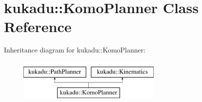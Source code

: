 \hypertarget{classkukadu_1_1KomoPlanner}{\section{kukadu\-:\-:Komo\-Planner Class Reference}
\label{classkukadu_1_1KomoPlanner}
}
Inheritance diagram for kukadu\-:\-:Komo\-Planner\-:\begin{figure}[H]
\begin{center}
\leavevmode
\includegraphics[height=2.000000cm]{classkukadu_1_1KomoPlanner}
\end{center}
\end{figure}
